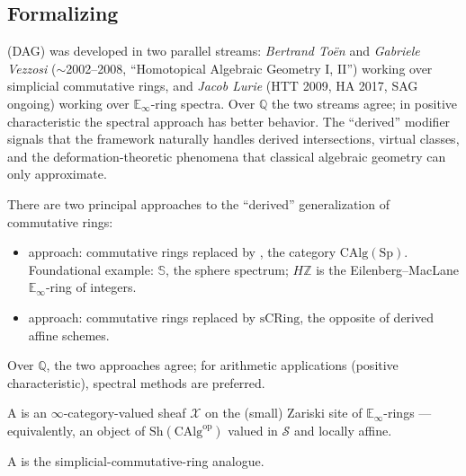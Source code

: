 \subsection{Formalizing}

\begin{nameorigin}
 (DAG) was developed in two parallel
streams: \emph{Bertrand Toën} and \emph{Gabriele Vezzosi} ($\sim$2002--2008,
``Homotopical Algebraic Geometry I, II'') working over simplicial
commutative rings, and \emph{Jacob Lurie} (HTT 2009, HA 2017, SAG ongoing)
working over $\mathbb{E}_\infty$-ring spectra. Over $\mathbb{Q}$ the two
streams agree; in positive characteristic the spectral approach has
better behavior. The ``derived'' modifier signals that the framework
naturally handles derived intersections, virtual classes, and the
deformation-theoretic phenomena that classical algebraic geometry can
only approximate.
\end{nameorigin}

\begin{definition}
\label{def:spectral-rings}
There are two principal approaches to the ``derived'' generalization of
commutative rings:
\begin{itemize}
  \item {} approach: commutative rings replaced by
        , the category $\mathrm{CAlg}(\mathrm{Sp})$.
        Foundational example: $\mathbb{S}$, the sphere spectrum;
        $H\mathbb{Z}$ is the Eilenberg–MacLane $\mathbb{E}_\infty$-ring
        of integers.
  \item {} approach: commutative rings replaced by
         $\mathrm{sCRing}$, the
        opposite of derived affine schemes.
\end{itemize}
Over $\mathbb{Q}$, the two approaches agree; for arithmetic applications
(positive characteristic), spectral methods are preferred.
\end{definition}

\begin{definition}
\label{def:spectral-scheme}
A  is an $\infty$-category-valued sheaf $\mathcal{X}$
on the (small) Zariski site of $\mathbb{E}_\infty$-rings — equivalently,
an object of $\mathrm{Sh}(\mathrm{CAlg}^{\mathrm{op}})$ valued in
$\mathcal{S}$ and locally affine.

A  is the simplicial-commutative-ring analogue.
\end{definition}

